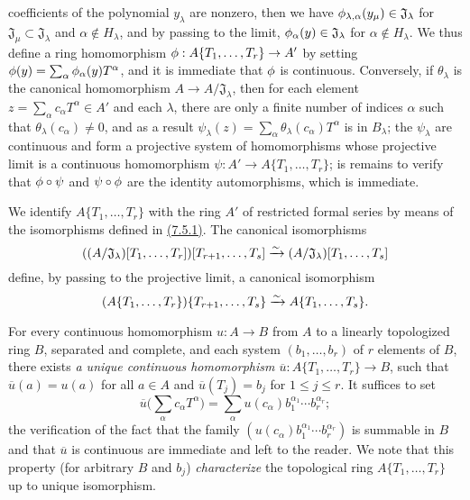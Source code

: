 \begin{env}[7.5.1]
coefficients of the polynomial $y_\lambda$ are nonzero, then we have
$\phi_{\lambda,\alpha}(y_\mu)\in\mathfrak{J}_\lambda$ for
$\mathfrak{J}_\mu\subset\mathfrak{J}_\lambda$ and $\alpha\not\in H_\lambda$, and by
passing to the limit, $\phi_\alpha(y)\in\mathfrak{J}_\lambda$ for
$\alpha\not\in H_\lambda$. We thus define a ring homomorphism
$\phi:A\{T_1,\dots,T_r\}\to A'$ by setting
$\phi(y)=\sum_\alpha\phi_\alpha(y)T^\alpha$, and it is immediate that $\phi$ is
continuous. Conversely, if $\theta_\lambda$ is the canonical homomorphism
$A\to A/\mathfrak{J}_\lambda$, then for each element
$z=\sum_\alpha c_\alpha T^\alpha\in A'$ and each $\lambda$, there are only a finite
number of indices $\alpha$ such that $\theta_\lambda(c_\alpha)\neq 0$, and as a
result $\psi_\lambda(z)=\sum_\alpha\theta_\lambda(c_\alpha)T^\alpha$ is in
$B_\lambda$; the $\psi_\lambda$ are continuous and form a projective system of
homomorphisms whose projective limit is a continuous homomorphism
$\psi:A'\to A\{T_1,\dots,T_r\}$; is remains to verify that $\phi\circ\psi$ and
$\psi\circ\phi$ are the identity automorphisms, which is immediate.
\end{env}

\begin{env}[7.5.2]
\label{env-0.7.5.2}
We identify $A\{T_1,\dots,T_r\}$ with the ring $A'$ of restricted formal series by
means of the isomorphisms defined in \hyperref[env-0.7.5.1]{(7.5.1)}. The canonical
isomorphisms
\[
  ((A/\mathfrak{J}_\lambda)[T_1,\dots,T_r])[T_{r+1},\dots,T_s]
  \xrightarrow{\sim}(A/\mathfrak{J}_\lambda)[T_1,\dots,T_s]
\]
define, by passing to the projective limit, a canonical isomorphism
\[
  (A\{T_1,\dots,T_r\})\{T_{r+1},\dots,T_s\}
  \xrightarrow{\sim} A\{T_1,\dots,T_s\}.
\]
\end{env}

\begin{env}[7.5.3]
\label{env-0.7.5.3}
For every continuous homomorphism $u:A\to B$ from $A$ to a linearly topologized ring
$B$, separated and complete, and each system $(b_1,\dots,b_r)$ of $r$ elements of $B$,
there exists {\em a unique continuous homomorphism $\overline{u}:A\{T_1,\dots,T_r\}\to B$},
such that $\overline{u}(a)=u(a)$ for all $a\in A$ and $\overline{u}(T_j)=b_j$ for
$1\leqslant j\leqslant r$. It suffices to set
\[
  \overline{u}\big(\sum_\alpha c_\alpha T^\alpha\big)
  =\sum_\alpha u(c_\alpha)b_1^{\alpha_1}\cdots b_r^{\alpha_r};
\]
the verification of the fact that the family $(u(c_\alpha)b_1^{\alpha_1}\cdots b_r^{\alpha_r})$
is summable in $B$ and that $\overline{u}$ is continuous are immediate and left to the
reader. We note that this property (for arbitrary $B$ and $b_j$) {\em characterize} the
topological ring $A\{T_1,\dots,T_r\}$ up to unique isomorphism.
\end{env}

